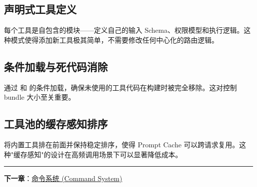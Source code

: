 \subsection{声明式工具定义}

每个工具是自包含的模块——定义自己的输入 Schema、权限模型和执行逻辑。这种模式使得添加新工具极其简单，不需要修改任何中心化的路由逻辑。

\subsection{条件加载与死代码消除}

通过  和  的条件加载，确保未使用的工具代码在构建时被完全移除。这对控制 bundle 大小至关重要。

\subsection{工具池的缓存感知排序}

将内置工具排在前面并保持稳定排序，使得 Prompt Cache 可以跨请求复用。这种"缓存感知"的设计在高频调用场景下可以显著降低成本。

\bigskip\noindent\rule{\textwidth}{0.4pt}\bigskip

\textbf{下一章}：\href{./chapter-07-command-system.md}{命令系统 (Command System)}
